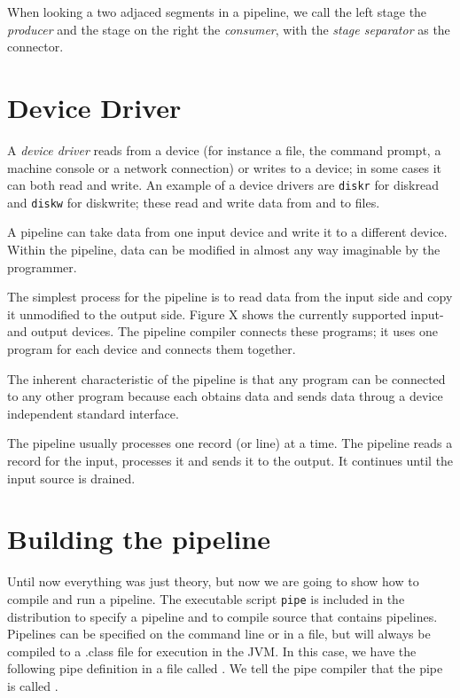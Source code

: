 When looking a two adjaced segments in a pipeline, we call the left
stage the \emph{producer} and the stage on the right the
\emph{consumer}, with the \emph{stage separator} as the connector.
\section{Device Driver}
A \emph{device driver} reads from a device (for instance a file, the
command prompt, a machine console or a network connection) or writes
to a device; in some cases it can both read and write. An example of a
device drivers are \texttt{diskr} for diskread and \texttt{diskw} for
diskwrite; these read and write data from and to files.

A pipeline can take data from one input device and write it to a
different device. Within the pipeline, data can be modified in almost
any way imaginable by the programmer.

The simplest process for the pipeline is to read data from the input
side and copy it unmodified to the output side. Figure X shows the
currently supported input- and output devices. The pipeline compiler
connects these programs; it uses one program for each device and
connects them together.

The inherent characteristic of the pipeline is that any program can be
connected to any other program because each obtains data and sends
data throug a device independent standard interface.

The pipeline usually processes one record (or line) at a time. The
pipeline reads a record for the input, processes it and sends it to
the output. It continues until the input source is drained.

\section{Building the pipeline}
Until now everything was just theory, but now we are going to show how
to compile and run a pipeline. The executable script \texttt{pipe} is
included in the \nr{} distribution to specify a pipeline and to compile
\nr{} source that contains pipelines. Pipelines can be specified on
the command line or in a file, but will always be compiled to a .class
file for execution in the JVM. In this case, we have the following
pipe definition in a file called . We tell the
pipe compiler that the pipe is called . 
 

